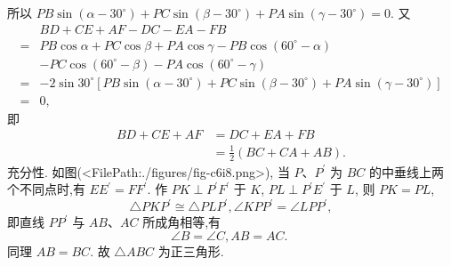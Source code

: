 所以 $P B \sin \left(\alpha-30^{\circ}\right)+P C \sin \left(\beta-30^{\circ}\right)+P A \sin \left(\gamma-30^{\circ}\right)=0$.
又
$$
\begin{aligned}
& B D+C E+A F-D C-E A-F B \\
= & P B \cos \alpha+P C \cos \beta+P A \cos \gamma-P B \cos \left(60^{\circ}-\alpha\right) \\
& -P C \cos \left(60^{\circ}-\beta\right)-P A \cos \left(60^{\circ}-\gamma\right) \\
= & -2 \sin 30^{\circ}\left[P B \sin \left(\alpha-30^{\circ}\right)+P C \sin \left(\beta-30^{\circ}\right)+P A \sin \left(\gamma-30^{\circ}\right)\right] \\
= & 0,
\end{aligned}
$$
即
$$
\begin{aligned}
B D+C E+A F & =D C+E A+F B \\
& =\frac{1}{2}(B C+C A+A B) .
\end{aligned}
$$
充分性.
如图(<FilePath:./figures/fig-c6i8.png>), 当 $P 、 P^{\prime}$ 为 $B C$ 的中垂线上两个不同点时,有 $E E^{\prime}=F F^{\prime}$. 作 $P K \perp P^{\prime} F^{\prime}$ 于 $K$, $P L \perp P^{\prime} E^{\prime}$ 于 $L$, 则 $P K=P L$,
$$
\triangle P K P^{\prime} \cong \triangle P L P^{\prime}, \angle K P P^{\prime}=\angle L P P^{\prime},
$$
即直线 $P P^{\prime}$ 与 $A B 、 A C$ 所成角相等,有
$$
\angle B=\angle C, A B=A C \text {. }
$$
同理 $A B=B C$.
故 $\triangle A B C$ 为正三角形.




